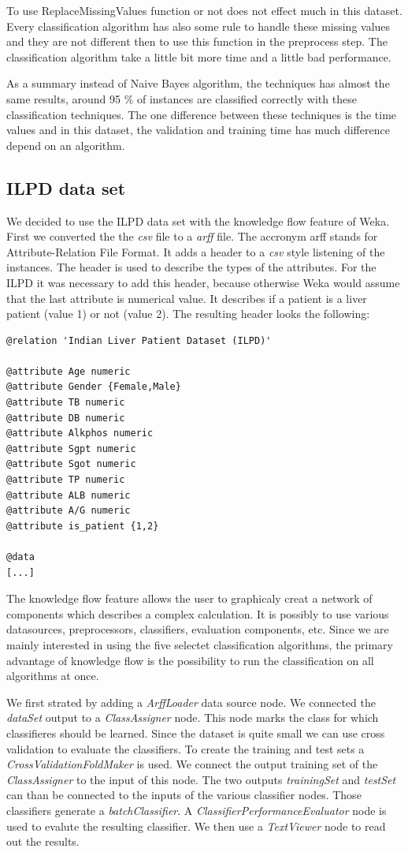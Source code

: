 \documentclass[a4paper]{article}
\begin{document}
To use ReplaceMissingValues function or not does not effect much in this dataset. Every classification algorithm has also some rule to handle these missing values and they are not different then to use this function in the preprocess step. The classification algorithm take a little bit more time and a little bad performance.

As a summary instead of Naive Bayes algorithm, the techniques has almost the same results, around 95 $\%$ of instances are classified correctly with these classification techniques. The one difference between these techniques is the time values and in this dataset, the validation and training time has much difference depend on an algorithm.  


\subsection{ILPD data set}
We decided to use the ILPD data set with the knowledge flow feature of Weka.
First we converted the the \emph{csv} file to a \emph{arff} file. The accronym
arff stands for Attribute-Relation File Format. It adds a header to a \emph{csv}
style listening of the instances. The header is used to describe the types of
the attributes. For the ILPD it was necessary to add this header, because
otherwise Weka would assume that the last attribute is numerical value. It
describes if a patient is a liver patient (value 1) or not (value 2). 
The resulting header looks the following:
\begin{verbatim}
@relation 'Indian Liver Patient Dataset (ILPD)'

@attribute Age numeric
@attribute Gender {Female,Male}
@attribute TB numeric
@attribute DB numeric
@attribute Alkphos numeric
@attribute Sgpt numeric
@attribute Sgot numeric
@attribute TP numeric
@attribute ALB numeric
@attribute A/G numeric
@attribute is_patient {1,2}

@data
[...]
\end{verbatim}

The knowledge flow feature allows the user to graphicaly creat a network of
components which describes a complex calculation. It is possibly to use various
datasources, preprocessors, classifiers, evaluation components, etc. Since we
are mainly interested in using the five selectet classification algorithms, the
primary advantage of knowledge flow is the possibility to run the classification
on all algorithms at once. 

We first strated by adding a \emph{ArffLoader} data source node. We connected
the \emph{dataSet} output to a \emph{ClassAssigner} node. This node marks the
class for which classifieres should be learned. Since the dataset is quite small
we can use cross validation to evaluate the classifiers. To create the training
and test sets a \emph{CrossValidationFoldMaker} is used. We connect the output
training set of the \emph{ClassAssigner} to the input of this node. The two
outputs \emph{trainingSet} and \emph{testSet} can than be connected to the
inputs of the various classifier nodes. Those classifiers generate a
\emph{batchClassifier}. A \emph{ClassifierPerformanceEvaluator} node is used to
evalute the resulting classifier. We then use a \emph{TextViewer} node to read
out the results.
\end{document}
